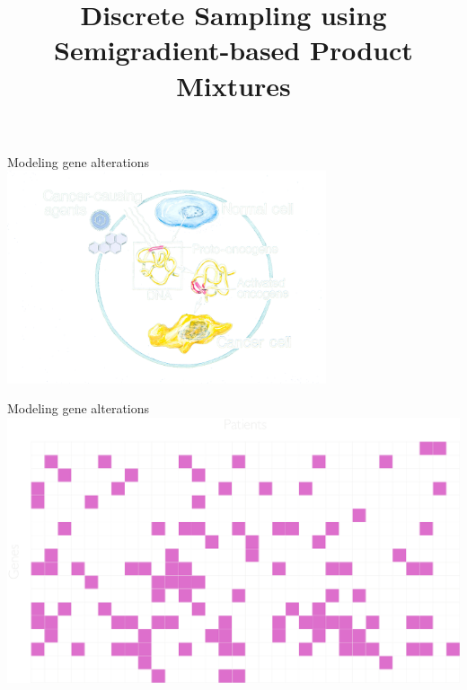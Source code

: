 \documentclass[mathserif]{beamer}
\title[Discrete Sampling using Semigradient-based Product Mixtures]
{Discrete Sampling using Semigradient-based Product Mixtures}
\author[Alkis Gotovos]{}
\begin{document}



\begin{frame}{Modeling gene alterations}
\includegraphics[width=3.7in]{figures/oncogene.png}\\
\end{frame}


\begin{frame}{Modeling gene alterations}
\centering
\includegraphics[width=\textwidth]{figures/grid_genes.pdf}
\end{frame}
\end{document}
